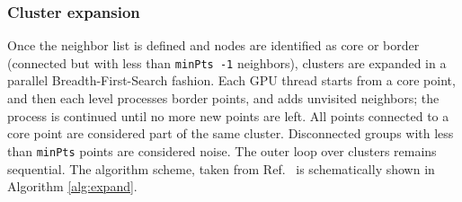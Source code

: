 \documentclass[final,1p,times]{elsarticle}
\begin{document}
\subsubsection{Cluster expansion}
Once the neighbor list is defined and nodes are identified as core or
border (connected but with less than {\tt minPts -1} neighbors),
clusters are expanded in a parallel Breadth-First-Search
fashion\cite{Andrade2013}. Each GPU thread starts from a core point,
and then each level processes border points, and adds unvisited
neighbors; the process is continued until no more new points are
left. All points connected to a core point are considered part of the
same cluster. Disconnected groups with less than {\tt minPts} points
are considered noise. The outer loop over clusters remains
sequential. The algorithm scheme, taken from
Ref.~\cite{LombaMoreno2026} is schematically shown in Algorithm
\ref{alg:expand}. 
\end{document}
